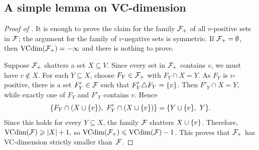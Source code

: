 
\subsection{A simple lemma on VC-dimension}
\lemVCind*
\begin{proof}[Proof of ]
It is enough to prove the claim for the family $\cal F_+$ of all $v$-positive sets in $\cal F$; the argument for the family of $v$-negative sets is symmetric.
If $\cal F_+=\emptyset$, then $\VCdim(\cal F_+)=-\infty$ and there is nothing to prove.

Suppose $\cal F_+$ shatters a set $X\subseteq V$.
Since every set in $\cal F_+$ contains $v$, we must have $v\notin X$.
For each $Y\subseteq X$, choose $F_Y\in\cal F_+$ with $F_Y\cap X=Y$.
As $F_Y$ is $v$-positive, there is a set $F'_Y\in\cal F$ such that $F'_Y\triangle F_Y=\set{v}$.
Then $F'_Y\cap X=Y$, while exactly one of $F_Y$ and $F'_Y$ contains $v$.
Hence
\[
\{F_Y\cap (X\cup\set{v}),\ F'_Y\cap (X\cup\set{v})\}=\set{Y\cup\set{v},\ Y}.
\]
Since this holds for every $Y\subseteq X$, the family $\cal F$ shatters $X\cup\set{v}$.
Therefore,
\(
\VCdim(\cal F)\ge |X|+1,
\)
so $\VCdim(\cal F_+)\le \VCdim(\cal F)-1$.
This proves that $\cal F_+$ has VC-dimension strictly smaller than~$\cal F$.
\end{proof}





